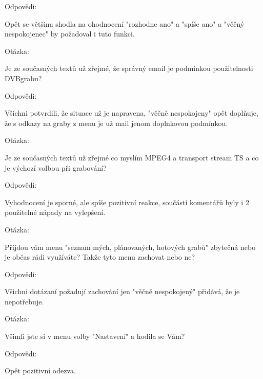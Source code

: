 \begin{bf}Odpovědi:\end{bf} Opět se většina shodla na ohodnocení "rozhodne ano" a "spíše ano" a "věčný nespokojenec" by požadoval i tuto funkci.

\vspace{10pt}
						
\begin{bf}Otázka:\end{bf} Je ze současných textů už zřejmé, že správný email je podmínkou použitelnosti DVBgrabu?

\begin{bf}Odpovědi:\end{bf} Všichni potvrdili, že situace už je napravena, "věčně nespokojeny" opět doplňuje, že s odkazy na graby z menu je už mail jenom doplnkovou podmínkou.
							
\vspace{10pt}

\begin{bf}Otázka:\end{bf} Je ze současných textů už zřejmé co myslím MPEG4 a transport stream TS a co je výchozí volbou při grabování?

\begin{bf}Odpovědi:\end{bf} Vyhodnocení je sporné, ale spíše pozitivní reakce, součástí komentářů byly i 2 použitelné nápady na vylepšení.
							
\vspace{10pt}

\begin{bf}Otázka:\end{bf} Příjdou vám menu "seznam mých, plánovaných, hotových grabů" zbytečná nebo je občas rádi využíváte? Takže tyto menu zachovat nebo ne?

\begin{bf}Odpovědi:\end{bf} Všichni dotázaní požadují zachování jen "věčně nespokojený" přidává, že je nepotřebuje.
							
\vspace{10pt}

\begin{bf}Otázka:\end{bf} Všimli jste si v menu volby "Nastavení" a hodila se Vám?	

\begin{bf}Odpovědi:\end{bf} Opět pozitivní odezva.
						
